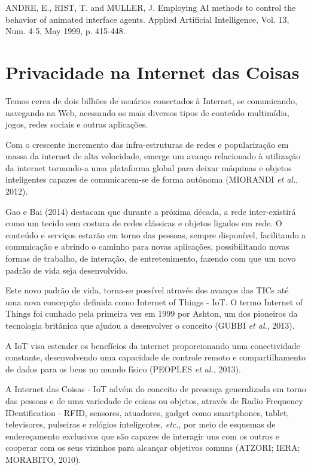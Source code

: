 ANDRE, E., RIST, T. and MULLER, J. Employing AI methods to control the behavior
of animated interface agents. Applied Artificial Intelligence, Vol. 13, Num. 4-5, May
1999, p. 415-448.

\section{Privacidade na Internet das Coisas} \label{s:privacidade_na_internet_das_coisas}

Temos cerca de dois bilhões de usuários conectados à Internet, se comunicando, navegando na Web, acessando os mais diversos tipos de conteúdo multimídia, jogos, redes sociais e outras aplicações.

Com o crescente incremento das infra-estruturas de redes e popularização em massa da internet de alta velocidade, emerge um avanço relacionado à utilização da internet tornando-a uma plataforma global para deixar máquinas e objetos inteligentes capazes de comunicarem-se de forma autônoma (MIORANDI \textit{et al.}, 2012).

Gao e Bai (2014) destacam que durante a próxima década, a rede inter-existirá como um tecido sem costura de redes clássicas e objetos ligados em rede. O conteúdo e serviços estarão em torno das pessoas, sempre disponível, facilitando a comunicação e abrindo o caminho para novas aplicações, possibilitando novas formas de trabalho, de interação, de entretenimento, fazendo com que um novo padrão de vida seja desenvolvido.

Este novo padrão de vida, torna-se possível através dos avanços das TICs até uma nova concepção definida como Internet of Things - IoT. O termo Internet of Things foi cunhado pela primeira vez em 1999 por Ashton, um dos pioneiros da tecnologia britânica que ajudou a desenvolver o conceito (GUBBI \textit{et al.}, 2013).

A IoT visa estender os benefícios da internet proporcionando uma conectividade constante, desenvolvendo uma capacidade de controle remoto e compartilhamento de dados para os bens no mundo físico (PEOPLES \textit{et al.}, 2013).

A Internet das Coisas - IoT advém do conceito de presença generalizada em torno das pessoas e de uma variedade de coisas ou objetos, através de Radio Frequency IDentification - RFID, sensores, atuadores, gadget como smartphones, tablet, televisores, pulseiras e relógios inteligentes, \textit{etc.}, por meio de esquemas de endereçamento exclusivos que são capazes de interagir uns com os outros e cooperar com os seus vizinhos para alcançar objetivos comuns (ATZORI; IERA; MORABITO, 2010).

